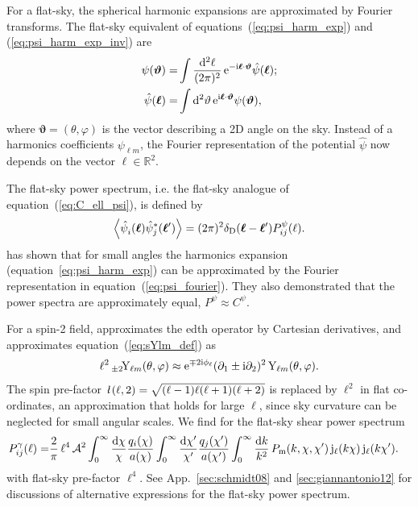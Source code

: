 \documentclass[fleqn,usenatbib]{mnras} %
\newcommand{\ellbar}{\hbox{\it \l}\,}
\newcommand{\pref}{{\cal A}}
\renewcommand{\vec}{\bm}
\begin{document}
For a flat-sky, the spherical harmonic expansions are approximated by Fourier
transforms. The flat-sky equivalent of equations~(\ref{eq:psi_harm_exp}) and
(\ref{eq:psi_harm_exp_inv}) are
%
\begin{align}
  \psi(\vec \vartheta) = & \int \frac{{\rm d}^2 \ell}{(2\pi)^2} \, {\rm e}^{-{\rm i} \vec \ell \cdot \vec \vartheta} \hat \psi(\vec \ell);
  \label{eq:psi_fourier}
  \\
  \hat \psi(\vec \ell) = & \int {\rm d}^2 \vartheta \, {\rm e}^{{\rm i} \vec \ell \cdot \vec \vartheta} \psi(\vec \vartheta),
  \label{eq:psi_fourier_inv}
\end{align}
%
where $\vec \vartheta = (\theta, \varphi)$ is the vector describing a 2D angle on the sky.
Instead of a harmonics coefficients $\psi_{\ell m}$, the Fourier representation of the potential
$\hat \psi$ now depends on the vector $\vec \ell \in \mathbb{R}^2$.

The flat-sky power spectrum, i.e. the flat-sky analogue of equation~(\ref{eq:C_ell_psi}), is defined by
%
\begin{equation}
  \left\langle \hat \psi_i^{}(\vec \ell) \hat \psi_j^\ast(\vec \ell^\prime) \right\rangle
    = (2\pi)^2 \delta_{\rm D}(\vec \ell - \vec \ell^\prime) P^\psi_{ij}(\ell).
  \label{eq:P_ell_psi}
\end{equation}
%
\cite{2000PhRvD..62d3007H} has shown that for small angles the harmonics
expansion (equation~\ref{eq:psi_harm_exp}) can be approximated by the Fourier
representation in equation~(\ref{eq:psi_fourier}). They also demonstrated that the power
spectra are approximately equal, $P^\psi \approx C^\psi$.

For a spin-2 field, \cite{2000PhRvD..62d3007H} approximates the edth operator
by Cartesian derivatives, and approximates equation~(\ref{eq:sYlm_def}) as
%
\begin{equation}
  \ell^2 \, _{\pm2}\!{\rm Y}_{\ell m}(\theta, \varphi) \approx  {\rm e}^{{\mp}2 {\rm i} \phi_\ell}
    (\partial_1 \pm {\rm i} \partial_2)^2 \, {\rm Y}_{\ell m}(\theta, \varphi).
  \label{eq:sYlm_def_flat}
\end{equation}
%
The spin pre-factor $\ellbar(\ell, 2) = \sqrt{(\ell-1) \ell (\ell+1) (\ell+2)}$
is replaced by $\ell^2$ in flat co-ordinates, an approximation that holds for
large $\ell$, since sky curvature can be neglected for small angular
scales. We find for the flat-sky shear power spectrum
%
\begin{align}
  P^\gamma_{ij}(\ell) 
                 = & \frac 2 \pi \, \ell^4 \, \pref^2
                 \int_{0}^\infty \frac{\rm d \chi}{\chi} \frac{q_i(\chi)}{a(\chi)}
                \int_{0}^\infty \frac{\rm d \chi^\prime}{\chi^\prime}
                \frac{q_j(\chi^\prime)}{a(\chi^\prime)}
                \int_0^\infty \frac{{\rm d} k}{k^2} \, P_{\rm m}(k, \chi, \chi^\prime) \,
                {\rm j}_\ell(k \chi) \, {\rm j}_\ell(k \chi^\prime) .
  \label{eq:P_ell_gamma_full_der}
\end{align}
%
with flat-sky pre-factor $\ell^4$. See App.~\ref{sec:schmidt08} and
\ref{sec:giannantonio12} for discussions of alternative expressions for the
flat-sky power spectrum.
\end{document}
